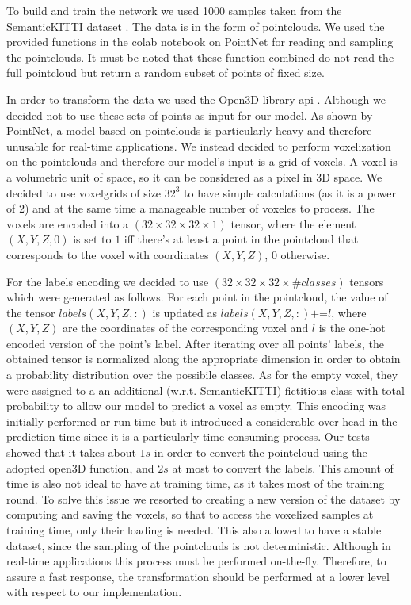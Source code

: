 To build and train the network we used 1000 samples taken from the SemanticKITTI dataset \cite{behley2019iccv}.
The data is in the form of pointclouds. We used the provided
functions in the colab notebook on PointNet for reading and sampling the pointclouds. It must be noted that these function combined
do not read the full pointcloud but return a random subset of points of fixed size.\par
In order to transform the data we used the Open3D library api \cite{zhou2018open3d}. 
Although we decided not to use these sets of points as input for our model. As shown by PointNet,
a model based on pointclouds is particularly heavy and therefore unusable for real-time applications.
We instead decided to perform voxelization on the pointclouds and therefore our model's input is a grid of voxels.
A voxel is a volumetric unit of space, so it can be considered as a pixel in 3D space.
We decided to use voxelgrids of size $32^3$ to have simple calculations (as it is a power of $2$) and at the same time a manageable number of voxeles to process.
The voxels are encoded into a $(32\times32\times32\times1)$ tensor, where the element $(X,Y,Z,0)$ is set to $1$ iff there's at least a point in the pointcloud that corresponds to the voxel with coordinates $(X,Y,Z)$, 0 otherwise.\par
For the labels encoding we decided to use $(32\times32\times32\times\#classes)$ tensors which were generated as follows.
For each point in the pointcloud, the value of the tensor 
$labels(X,Y,Z,:)$ is updated as $labels(X,Y,Z,:)\textrm{+=}l$, where $(X,Y,Z)$ are the coordinates of the corresponding voxel and $l$ is the one-hot encoded version
of the point's label.
After iterating over all points' labels, the obtained tensor is normalized along the appropriate dimension in order to obtain a probability distribution over the possibile classes. 
As for the empty voxel, they were assigned to a an additional (w.r.t. SemanticKITTI) fictitious class with total probability to 
allow our model to predict a voxel as empty.
This encoding was initially performed ar run-time but it introduced a considerable over-head in the prediction time since
it is a particularly time consuming process. Our tests showed that it takes about $1s$ in order to convert the pointcloud
using the adopted open3D function, and $2s$ at most to convert the labels. This amount of time
is also not ideal to have at training time, as it takes most of the training round. 
To solve this issue we resorted to creating a new version of the dataset by computing and saving the voxels, so that to access the voxelized samples
at training time, only their loading is needed. This also allowed to have a stable dataset, since the sampling of the pointclouds
is not deterministic. Although in real-time applications this process must be performed on-the-fly. Therefore, to assure a fast response,
the transformation should be performed at a lower level with respect to our implementation.